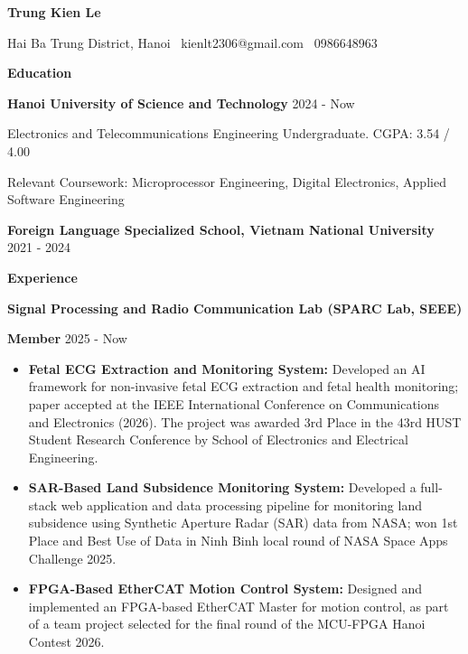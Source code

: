\documentclass[11pt]{article}
\begin{document}
\begin{center}
    \textbf{Trung Kien Le}\\ 
    \hrulefill
\end{center}

\begin{center}
    Hai Ba Trung District, Hanoi \textbullet \ kienlt2306@gmail.com \textbullet \ 0986648963
\end{center}

\vspace{0.5pt}

\begin{center}
    \textbf{Education}
\end{center}
\textbf{Hanoi University of Science and Technology} \hfill 2024 - Now

Electronics and Telecommunications Engineering Undergraduate. CGPA: 3.54 / 4.00 

Relevant Coursework: Microprocessor Engineering, Digital Electronics, Applied Software Engineering

\vspace{12pt}

\vspace{12pt}

\textbf{Foreign Language Specialized School, Vietnam National University} \hfill	2021 - 2024

\vspace{12pt}

\begin{center}
    \textbf{Experience}
\end{center}
\textbf{Signal Processing and Radio Communication Lab (SPARC Lab, SEEE) } 

\textbf{Member} \hfill 2025 - Now
\begin{itemize}[noitemsep, topsep=0pt, partopsep=0pt, parsep=0pt]
    \item \textbf{Fetal ECG Extraction and Monitoring System:} Developed an AI framework for non-invasive fetal ECG extraction and fetal health monitoring; paper accepted at the IEEE International Conference on Communications and Electronics (2026). The project was awarded 3rd Place in the 43rd HUST Student Research Conference by School of Electronics and Electrical Engineering.
    \item \textbf{SAR-Based Land Subsidence Monitoring System:} Developed a full-stack web application and data processing pipeline for monitoring land subsidence using Synthetic Aperture Radar (SAR) data from NASA; won 1st Place and Best Use of Data in Ninh Binh local round of NASA Space Apps Challenge 2025.
    \item \textbf{FPGA-Based EtherCAT Motion Control System:} Designed and implemented an FPGA-based EtherCAT Master for motion control, as part of a team project selected for the final round of the MCU-FPGA Hanoi Contest 2026.    
    
\end{itemize}
\end{document}
